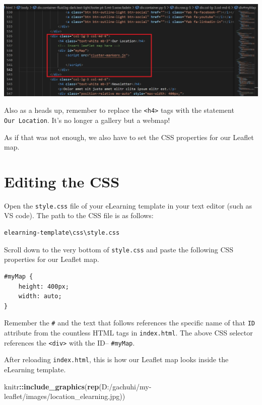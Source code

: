 \documentclass[
]{book}
\newenvironment{Shaded}{\begin{snugshade}}{\end{snugshade}}
\newcommand{\FunctionTok}[1]{\textcolor[rgb]{0.13,0.29,0.53}{\textbf{#1}}}
\newcommand{\NormalTok}[1]{#1}
\newcommand{\SpecialCharTok}[1]{\textcolor[rgb]{0.81,0.36,0.00}{\textbf{#1}}}
\newcommand{\StringTok}[1]{\textcolor[rgb]{0.31,0.60,0.02}{#1}}
\begin{document}
\includegraphics{../images/div_replace.jpg}

Also as a heads up, remember to replace the \texttt{\textless{}h4\textgreater{}} tags with the statement \texttt{Our\ Location}. It's no longer a gallery but a webmap!

As if that was not enough, we also have to set the CSS properties for our Leaflet map.

\hypertarget{editing-the-css}{%
\section{Editing the CSS}\label{editing-the-css}}

Open the \texttt{style.css} file of your eLearning template in your text editor (such as VS code). The path to the CSS file is as follows:

\begin{verbatim}
elearning-template\css\style.css
\end{verbatim}

Scroll down to the very bottom of \texttt{style.css} and paste the following CSS properties for our Leaflet map.

\begin{verbatim}
#myMap { 
    height: 400px;
    width: auto; 
}
\end{verbatim}

Remember the \texttt{\#} and the text that follows references the specific name of that \texttt{ID} attribute from the countless HTML tags in \texttt{index.html}. The above CSS selector references the \texttt{\textless{}div\textgreater{}} with the ID-- \texttt{\#myMap}.

After reloading \texttt{index.html}, this is how our Leaflet map looks inside the eLearning template.

\begin{Shaded}
\begin{Highlighting}[]
\NormalTok{knitr}\SpecialCharTok{::}\FunctionTok{include\_graphics}\NormalTok{(}\FunctionTok{rep}\NormalTok{(}\StringTok{\textquotesingle{}D:/gachuhi/my{-}leaflet/images/location\_elearning.jpg\textquotesingle{}}\NormalTok{))}
\end{Highlighting}
\end{Shaded}
\end{document}
